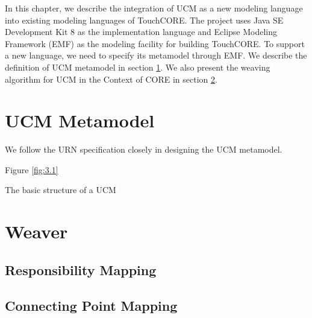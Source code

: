 In this chapter, we describe the integration of UCM as a new modeling language into existing modeling languages of TouchCORE. The project uses Java SE Development Kit 8 as the implementation language and Eclipse Modeling Framework (EMF) \cite{steinberg2008emf} as the modeling facility for building TouchCORE. To support a new language, we need to specify its metamodel through EMF. We describe the definition of UCM metamodel in section \ref{sec:3.1}. We also present the weaving algorithm for UCM in the Context of CORE in section \ref{sec:3.2}.

\section{UCM Metamodel} \label{sec:3.1}


We follow the URN specification \cite{itu2012151} closely in designing the UCM metamodel. 

Figure \ref{fig:3.1} 

The basic structure of a UCM 

\section{Weaver} \label{sec:3.2}


\subsection{Responsibility Mapping}

\subsection{Connecting Point Mapping}
